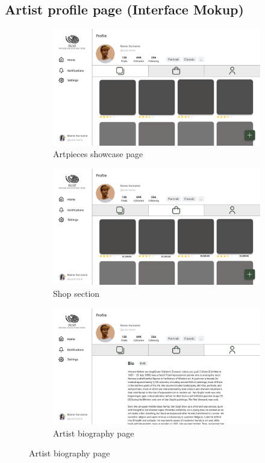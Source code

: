\subsection{Artist profile page (Interface Mokup)}
\begin{figure}[H]
    \centering
\begin{subfigure}[b]{\myfigwidth}
    \centering
    \includegraphics[width=\textwidth]{images/interface_mockups/Artist profile - showcase.pdf}
    \caption{Artpieces showcase page}
\end{subfigure}
\begin{subfigure}[b]{\myfigwidth}
    \centering
    \includegraphics[width=\textwidth]{images/interface_mockups/Artist profile - shop.pdf}
    \caption{Shop section}
\end{subfigure}
\begin{subfigure}[b]{\myfigwidth}
    \centering
    \includegraphics[width=\textwidth]{images/interface_mockups/Artist profile - bio.pdf}
    \caption{Artist biography page}
\end{subfigure}
\end{figure}

